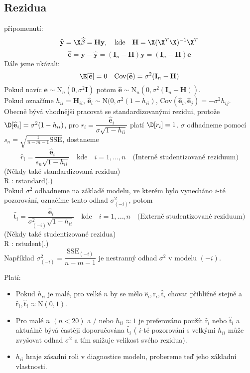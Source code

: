 \subsection{Rezidua}
připomenutí:
$$
 \widehat{\textbf{y}} = \X \widehat{\beta} = \textbf{Hy} , \quad \text{kde} \quad \textbf{H} = \X ( \X ^{T} \X )^{-1} \X ^{T}
$$
$$
 \widehat{\textbf{e}} = \textbf{y} - \widehat{\textbf{y}} = ( \textbf{I}_n - \textbf{H} ) \textbf{y} =  ( \textbf{I}_n - \textbf{H} ) \textbf{e}
$$
Dále jsme ukázali:
$$
\E [ \widehat{\textbf{e}} ] = 0 \quad \text{Cov}(  \widehat{\textbf{e}} ) = \sigma^{2} ( \textbf{I}_n - \textbf{H} )
$$
Pokud navíc 
$
\textbf{e} \sim \text{N}_n ( 0 ,\sigma^{2} \textbf{I} ) $ potom $ \widehat{\textbf{e}} \sim \text{N}_n ( 0 ,\sigma^{2} ( \textbf{I}_n - \textbf{H})) 
$. \\ Pokud označíme $ h_{ii} = \textbf{H}_{ii} $, $ \widehat{\textbf{e}}_i \sim \text{N} ( 0 , \sigma^2 (1 - h_{ii} ) $, $ \text{Cov}( \widehat{\textbf{e}}_i , \widehat{\textbf{e}}_j  ) = -\sigma^2 h_{ij} $. \\
Obecně bývá vhodnější pracovat se standardizovanými rezidui, protože $ \D [  \widehat{\textbf{e}}_i ] = \sigma^2 (1 - h_{ii} ) $, pro $ r_i = \dfrac{\widehat{\textbf{e}}_i}{\sigma \sqrt{1-h_{ii}}} $ platí $ \D [ r_i ] = 1 $.
$ \sigma $ odhadneme pomocí $ s_n =  \sqrt{\frac{1}{n-m-1} \text{SSE}}$, dostaneme
$$
  \widehat{r}_i = \frac{\widehat{\textbf{e}}_i}{s_n \sqrt{1 - h_{ii}}} \quad \text{kde} \quad i = 1, \dots , n \quad \text{(Interně studentizované reziduum)}
$$
(Někdy také standardizovaná rezidua) \\
R : rstandard(.) \\
Pokud $ \sigma^2 $ odhadneme na základě modelu, ve kterém bylo vynecháno $ i $-té pozorování, označíme tento odhad $ \sigma^2_{(-i)} $, potom
$$
 \widehat{\text{t}}_i = \frac{\widehat{\textbf{e}}_i}{  \sigma^2_{(-i)} \sqrt{1 - h_{ii}}} \quad \text{kde} \quad i = 1, \dots , n \quad \text{(Externě studentizované reziduum)} 
$$
(Někdy také studentizované rezidua) \\
R : rstudent(.) \\
Například $ \sigma^2_{(-i)} = \dfrac{\text{SSE}_{(-i)}}{n-m-1} $ je nestranný odhad $ \sigma^2 $ v modelu $ (-i) $.
\begin{remark}
Platí:
\begin{itemize}
\item Pokud $ h_{ii} $ je malé, pro velké $ n $ by se mělo $ \widehat{\text{e}}_i, \widehat{\text{r}}_i, \widehat{\text{t}}_i $ chovat přibližně stejně a $  \widehat{\text{r}}_i ,\widehat{\text{t}}_i \approx \text{N} ( 0 , 1 ) $. 
\item Pro malé $ n $ $ ( n < 20 ) $ a / nebo  $ h_{ii} \approx 1 $ je preferováno použít $\widehat{\text{r}}_i$ nebo $\widehat{\text{t}}_i $ a aktuálně bývá častěji doporučována $\widehat{\text{t}}_i $ ( $ i $-té pozorování s velkými $ h_{ii} $ může zvyšovat odhad $ \sigma^2 $ a tím snižuje velikost svého rezidua).
\item $ h_{ii} $ hraje zásadní roli v diagnostice modelu, probereme teď jeho základní vlastnosti.
\end{itemize}
\end{remark}

